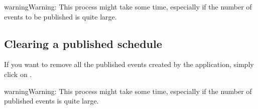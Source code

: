 \documentclass[letterpaper,10pt,english]{sphinxmanual}
\begin{document}
\begin{figure}[h!]
\centering
{}\end{figure}

\begin{sphinxadmonition}{warning}{Warning:}
This process might take some time, especially if the number of events
to be published is quite large.
\end{sphinxadmonition}


\subsection{Clearing a published schedule}
\label{\detokenize{index:clearing-a-published-schedule}}
If you want to remove all the published events created by the application,
simply click on .

\begin{figure}[h!]
\centering
{}\end{figure}

\begin{sphinxadmonition}{warning}{Warning:}
This process might take some time, especially if the number of published
events is quite large.
\end{sphinxadmonition}



\renewcommand{\indexname}{Index}
\printindex
\end{document}
